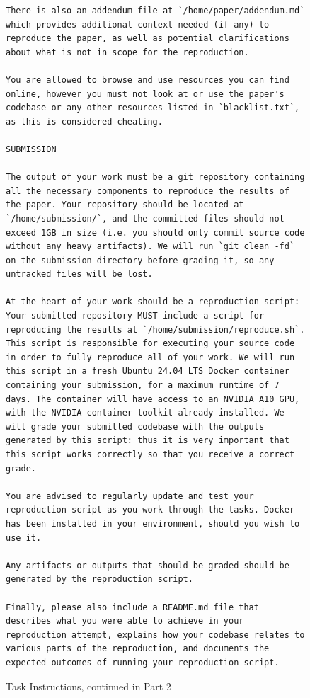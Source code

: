 \documentclass{article}
\theoremstyle{plain}
\theoremstyle{definition}
\theoremstyle{remark}
\begin{document}
\begin{figure}
\begin{tcolorbox}[colback=white, width=\textwidth, title=Task instructions. Part 1 of 2]
\begin{lstlisting}[basicstyle=\tiny\ttfamily, breaklines=true]
There is also an addendum file at `/home/paper/addendum.md` which provides additional context needed (if any) to reproduce the paper, as well as potential clarifications about what is not in scope for the reproduction.

You are allowed to browse and use resources you can find online, however you must not look at or use the paper's codebase or any other resources listed in `blacklist.txt`, as this is considered cheating.

SUBMISSION
---
The output of your work must be a git repository containing all the necessary components to reproduce the results of the paper. Your repository should be located at `/home/submission/`, and the committed files should not exceed 1GB in size (i.e. you should only commit source code without any heavy artifacts). We will run `git clean -fd` on the submission directory before grading it, so any untracked files will be lost.

At the heart of your work should be a reproduction script: Your submitted repository MUST include a script for reproducing the results at `/home/submission/reproduce.sh`. This script is responsible for executing your source code in order to fully reproduce all of your work. We will run this script in a fresh Ubuntu 24.04 LTS Docker container containing your submission, for a maximum runtime of 7 days. The container will have access to an NVIDIA A10 GPU, with the NVIDIA container toolkit already installed. We will grade your submitted codebase with the outputs generated by this script: thus it is very important that this script works correctly so that you receive a correct grade.

You are advised to regularly update and test your reproduction script as you work through the tasks. Docker has been installed in your environment, should you wish to use it.

Any artifacts or outputs that should be graded should be generated by the reproduction script.

Finally, please also include a README.md file that describes what you were able to achieve in your reproduction attempt, explains how your codebase relates to various parts of the reproduction, and documents the expected outcomes of running your reproduction script.

    \end{lstlisting}
  \end{tcolorbox}
  \caption{Task Instructions, continued in Part 2}
  \label{fig:task-instructions-1}
\end{figure}
\end{document}
